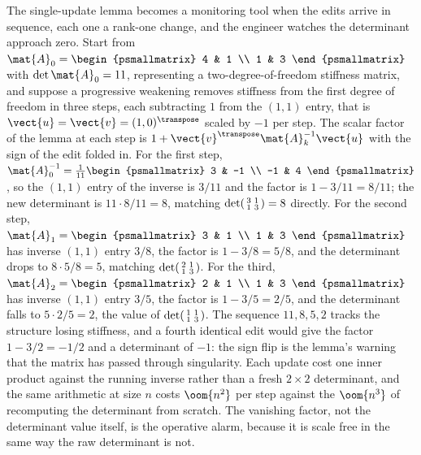 \begin{example}
The single-update lemma becomes a monitoring tool when the edits arrive
in sequence, each one a rank-one change, and the engineer watches the
determinant approach zero. Start from $\mat{A}_{0} = \begin{psmallmatrix}
4 & 1 \\ 1 & 3 \end{psmallmatrix}$ with $\det\mat{A}_{0} = 11$,
representing a two-degree-of-freedom stiffness matrix, and suppose a
progressive weakening removes stiffness from the first degree of
freedom in three steps, each subtracting $1$ from the $(1,1)$ entry,
that is $\vect{u} = \vect{v} = (1, 0)^{\transpose}$ scaled by $-1$ per
step. The scalar factor of the lemma at each step is $1 +
\vect{v}^{\transpose}\mat{A}_{k}^{-1}\vect{u}$ with the sign of the
edit folded in. For the first step, $\mat{A}_{0}^{-1} = \tfrac{1}{11}
\begin{psmallmatrix} 3 & -1 \\ -1 & 4 \end{psmallmatrix}$, so the
$(1,1)$ entry of the inverse is $3/11$ and the factor is $1 - 3/11 =
8/11$; the new determinant is $11 \cdot 8/11 = 8$, matching
$\det\begin{psmallmatrix} 3 & 1 \\ 1 & 3 \end{psmallmatrix} = 8$
directly. For the second step, $\mat{A}_{1} = \begin{psmallmatrix} 3 &
1 \\ 1 & 3 \end{psmallmatrix}$ has inverse $(1,1)$ entry $3/8$, the
factor is $1 - 3/8 = 5/8$, and the determinant drops to $8 \cdot 5/8 =
5$, matching $\det\begin{psmallmatrix} 2 & 1 \\ 1 & 3
\end{psmallmatrix}$. For the third, $\mat{A}_{2} = \begin{psmallmatrix}
2 & 1 \\ 1 & 3 \end{psmallmatrix}$ has inverse $(1,1)$ entry $3/5$, the
factor is $1 - 3/5 = 2/5$, and the determinant falls to $5 \cdot 2/5 =
2$, the value of $\det\begin{psmallmatrix} 1 & 1 \\ 1 & 3
\end{psmallmatrix}$. The sequence $11, 8, 5, 2$ tracks the structure
losing stiffness, and a fourth identical edit would give the factor
$1 - 3/2 = -1/2$ and a determinant of $-1$: the sign flip is the
lemma's warning that the matrix has passed through singularity. Each
update cost one inner product against the running inverse rather than a
fresh $2 \times 2$ determinant, and the same arithmetic at size $n$
costs $\oom{n^{2}}$ per step against the $\oom{n^{3}}$ of recomputing
the determinant from scratch. The vanishing factor, not the determinant
value itself, is the operative alarm, because it is scale free in the
same way the raw determinant is not.
\end{example}

